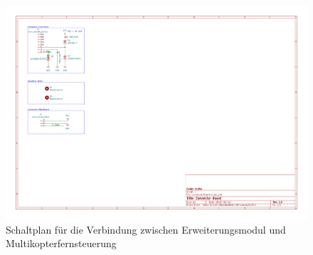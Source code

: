 \begin{figure}[htp]
    \centering
    \includegraphics[width=0.9\textheight,angle=90]{../PDFs/connectorBoard.pdf}
    \caption{Schaltplan für die Verbindung zwischen Erweiterungsmodul und Multikopterfernsteuerung}
    \label{fig:connectorPCB}
\end{figure}